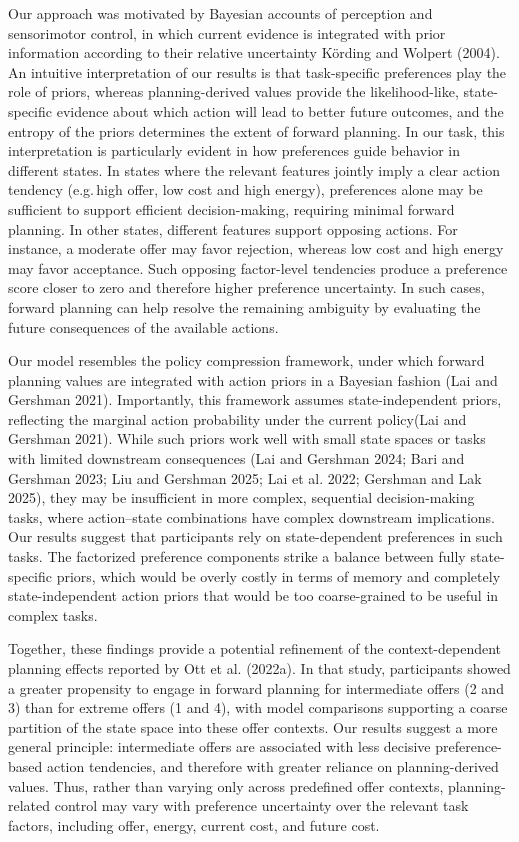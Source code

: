 \documentclass[
  letterpaper,
  DIV=11,
  numbers=noendperiod]{scrartcl}
\begin{document}
Our approach was motivated by Bayesian accounts of perception and
sensorimotor control, in which current evidence is integrated with prior
information according to their relative uncertainty Körding and Wolpert
(2004). An intuitive interpretation of our results is that task-specific
preferences play the role of priors, whereas planning-derived values
provide the likelihood-like, state-specific evidence about which action
will lead to better future outcomes, and the entropy of the priors
determines the extent of forward planning. In our task, this
interpretation is particularly evident in how preferences guide behavior
in different states. In states where the relevant features jointly imply
a clear action tendency (e.g.\,high offer, low cost and high energy),
preferences alone may be sufficient to support efficient
decision-making, requiring minimal forward planning. In other states,
different features support opposing actions. For instance, a moderate
offer may favor rejection, whereas low cost and high energy may favor
acceptance. Such opposing factor-level tendencies produce a preference
score closer to zero and therefore higher preference uncertainty. In
such cases, forward planning can help resolve the remaining ambiguity by
evaluating the future consequences of the available actions.

Our model resembles the policy compression framework, under which
forward planning values are integrated with action priors in a Bayesian
fashion (Lai and Gershman 2021). Importantly, this framework assumes
state-independent priors, reflecting the marginal action probability
under the current policy(Lai and Gershman 2021). While such priors work
well with small state spaces or tasks with limited downstream
consequences (Lai and Gershman 2024; Bari and Gershman 2023; Liu and
Gershman 2025; Lai et al. 2022; Gershman and Lak 2025), they may be
insufficient in more complex, sequential decision-making tasks, where
action--state combinations have complex downstream implications. Our
results suggest that participants rely on state-dependent preferences in
such tasks. The factorized preference components strike a balance
between fully state-specific priors, which would be overly costly in
terms of memory and completely state-independent action priors that
would be too coarse-grained to be useful in complex tasks.

Together, these findings provide a potential refinement of the
context-dependent planning effects reported by Ott et al. (2022a). In
that study, participants showed a greater propensity to engage in
forward planning for intermediate offers (2 and 3) than for extreme
offers (1 and 4), with model comparisons supporting a coarse partition
of the state space into these offer contexts. Our results suggest a more
general principle: intermediate offers are associated with less decisive
preference-based action tendencies, and therefore with greater reliance
on planning-derived values. Thus, rather than varying only across
predefined offer contexts, planning-related control may vary with
preference uncertainty over the relevant task factors, including offer,
energy, current cost, and future cost.
\end{document}
